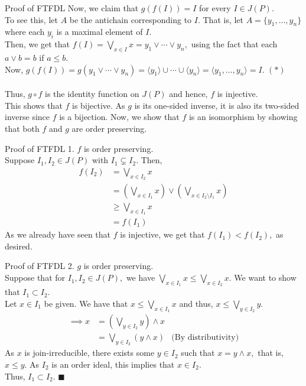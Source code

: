 \documentclass[handout, aspectratio=169]{beamer}
\begin{document}
\begin{frame}{Proof of FTFDL}
	Now, we claim that $g(f(I)) = I$ for every $I \in J(P).$\\
	To see this, let $A$ be the antichain corresponding to $I.$ That is, let $A = \{y_1, \ldots, y_n\}$ where each $y_i$ is a maximal element of $I.$\\
	Then, we get that $f(I) = \displaystyle\bigvee_{x\in I}x = y_1 \vee \cdots \vee y_n,$ using the fact that each $a \vee b = b$ if $a \le b.$\\
	Now, $g(f(I)) =  g(y_1 \vee \cdots \vee y_n) = \langle y_1\rangle\cup\cdots\cup\langle y_n\rangle = \langle y_1, \ldots, y_n\rangle = I.$ \hfill $(*)$\\~\\
	Thus, $g\circ f$ is the identity function on $J(P)$ and hence, $f$ is injective.\\
	This shows that $f$ is bijective. As $g$ is its one-sided inverse, it is also its two-sided inverse since $f$ is a bijection. Now, we show that $f$ is an isomorphism by showing that both $f$ and $g$ are order preserving.
\end{frame}
\begin{frame}{Proof of FTFDL}
	1. $f$ is order preserving.\\
	Suppose $I_1, I_2 \in J(P)$ with $I_1 \subsetneq I_2.$ Then,
	\begin{align*}
		f(I_2) &= \bigvee_{x \in I_2}x\\
		&= \left(\bigvee_{x \in I_1}x\right)\vee\left(\bigvee_{x\in I_2\setminus I_1}x\right)\\
		& \ge \bigvee_{x \in I_1}x\\
		&= f(I_1)
	\end{align*}
	As we already have seen that $f$ is injective, we get that $f(I_1) < f(I_2),$ as desired.
\end{frame}
\begin{frame}{Proof of FTFDL}
	2. $g$ is order preserving.\\
	Suppose that for $I_1, I_2 \in J(P),$ we have $\displaystyle\bigvee_{x \in I_1} x \le \displaystyle\bigvee_{x \in I_2} x.$ We want to show that $I_1 \subset I_2.$\\
	Let $x \in I_1$ be given. We have that $x \le \displaystyle\bigvee_{x \in I_1} x$ and thus, $x \le \displaystyle\bigvee_{y \in I_2} y.$
	\begin{align*}
		\implies x &= \left(\displaystyle\bigvee_{y \in I_2} y\right)\wedge x\\
		&= \bigvee_{y\in I_2}(y\wedge x) & \text{(By distributivity)}
	\end{align*}
	As $x$ is join-irreducible, there exists some $y \in I_2$ such that $x = y \wedge x,$ that is, $x \le y.$ As $I_2$ is an order ideal, this implies that $x \in I_2.$\\
	Thus, $I_1 \subset I_2.$ \hfill $\blacksquare$
\end{frame}
\end{document}
